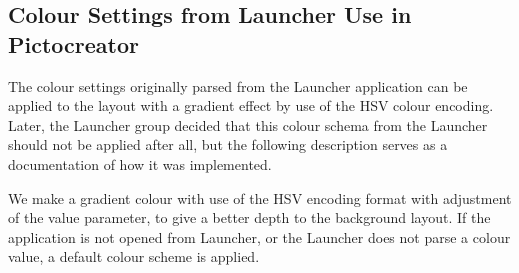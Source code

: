 \subsection{Colour Settings from Launcher Use in Pictocreator}
The colour settings originally parsed from the Launcher application can be applied to the layout with a gradient effect by use of the HSV colour encoding.
Later, the Launcher group decided that this colour schema from the Launcher should not be applied after all, but the following description serves as a documentation of how it was implemented.

We make a gradient colour with use of the HSV encoding format with adjustment of the value parameter, to give a better depth to the background layout.
If the application is not opened from Launcher, or the Launcher does not parse a colour value, a default colour scheme is applied.
